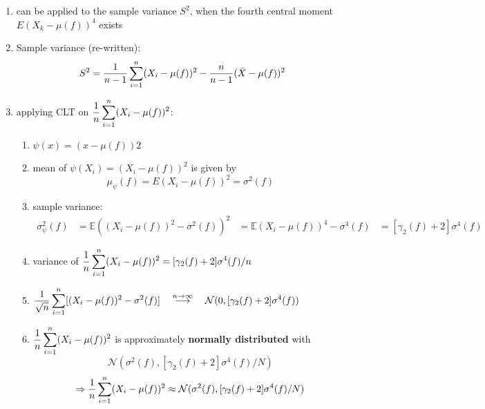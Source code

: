 \begin{enumerate}
    \item can be applied to the sample variance $S^2$, when the fourth central moment $E(X_k - \mu(f))^4$ exists

    \item Sample variance (re-written):
    \[
        S^2=
        \dfrac{1}{n-1}
        \displaystyle\sum_{i=1}^{n} (X_i-\mu(f))^2 -
        \dfrac{n}{n-1} (\bar{X} - \mu(f))^2
    \]

    \item applying CLT on $\dfrac{1}{n}
        \displaystyle\sum_{i=1}^{n} (X_i-\mu(f))^2$:
    \begin{enumerate}
        \item $\psi (x) = (x - \mu (f))2$
    
        \item mean of $\psi (X_i) = (X_i - \mu (f))^2$ is given by 
        \[
            \mu _\psi (f) = E(X_i -\mu (f))^2 = \sigma^2(f)
        \]
        
        \item sample variance:
        \[
        \begin{aligned}
            \sigma ^2_\psi ( f ) 
            &= \mathbb{E}((X_i - \mu( f ))^2 - \sigma ^2( f ))^2
            &= \mathbb{E}(X_i - \mu( f ))^4 - \sigma ^4( f ) 
            &= [\gamma_2( f ) + 2]\sigma ^4( f )
        \end{aligned}
        \]
    
        \item variance of $
            \dfrac{1}{n}
            \displaystyle\sum_{i=1}^{n} (X_i -\mu( f ))^2
            =
            [\gamma_2( f ) + 2]\sigma^4( f )/n
        $

        \item $
            \dfrac{1}{\sqrt{n}}
            \displaystyle\sum_{i=1}^{n}
            [(X_i - \mu( f )) ^2 - \sigma^2 ( f )]
            \quad
            \overset{n\to \infty}{\longrightarrow}
            \quad
            \mathcal{N}(0,[\gamma_2( f ) + 2]\sigma^4( f ))
        $

        \item $
            \dfrac{1}{n}
            \displaystyle\sum_{i=1}^{n} (X_i - \mu(f))^2
        $ 
        is approximately \textbf{normally distributed} with
        \[
            \mathcal{N}(\sigma^2( f ),[\gamma_2( f ) + 2]\sigma^4( f )/N )
        \]
        \[
            \Rightarrow
            \dfrac{1}{n}
            \displaystyle\sum_{i=1}^{n} (X_i - \mu(f))^2
            \approx
            \mathcal{N}(\sigma^2( f ),[\gamma_2( f ) + 2]\sigma^4( f )/N )
        \]


\end{enumerate}
\end{enumerate}
